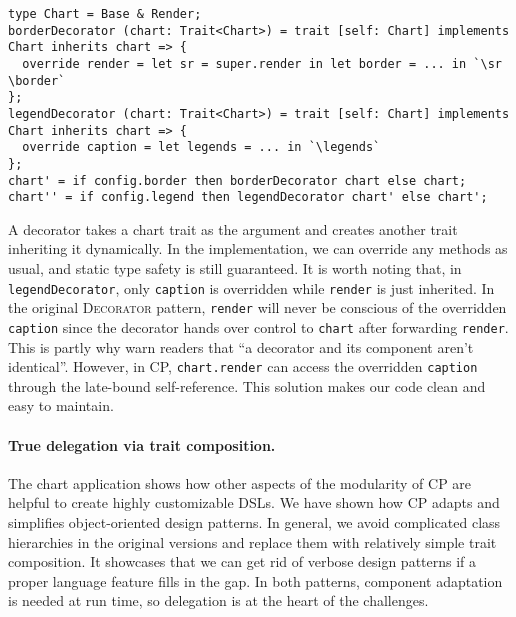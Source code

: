 \begin{lstlisting}
type Chart = Base & Render;
borderDecorator (chart: Trait<Chart>) = trait [self: Chart] implements Chart inherits chart => {
  override render = let sr = super.render in let border = ... in `\sr \border`
};
legendDecorator (chart: Trait<Chart>) = trait [self: Chart] implements Chart inherits chart => {
  override caption = let legends = ... in `\legends`
};
chart' = if config.border then borderDecorator chart else chart;
chart'' = if config.legend then legendDecorator chart' else chart';
\end{lstlisting}

\noindent
A decorator takes a chart trait as the argument and creates another trait
inheriting it dynamically. In the implementation, we can override any methods as
usual, and static type safety is still guaranteed. It is worth noting that, in
\lstinline{legendDecorator}, only \lstinline{caption} is overridden while
\lstinline{render} is just inherited. In the original \textsc{Decorator}
pattern, \lstinline{render} will never be conscious of the overridden
\lstinline{caption} since the decorator hands over control to \lstinline{chart}
after forwarding \lstinline{render}. This is partly why \citet{gamma1995design}
warn readers that ``a decorator and its component aren't identical''. However,
in CP, \lstinline{chart.render} can access the overridden \lstinline{caption}
through the late-bound self-reference. This solution makes our code clean and
easy to maintain.

\paragraph{True delegation via trait composition.}
The chart application shows how other aspects of the modularity of CP are
helpful to create highly customizable DSLs. We have shown how CP adapts and
simplifies object-oriented design patterns. In general, we avoid complicated
class hierarchies in the original versions and replace them with relatively
simple trait composition. It showcases that we can get rid of verbose design
patterns if a proper language feature fills in the gap. In both patterns,
component adaptation is needed at run time, so delegation is at the heart of the
challenges.
